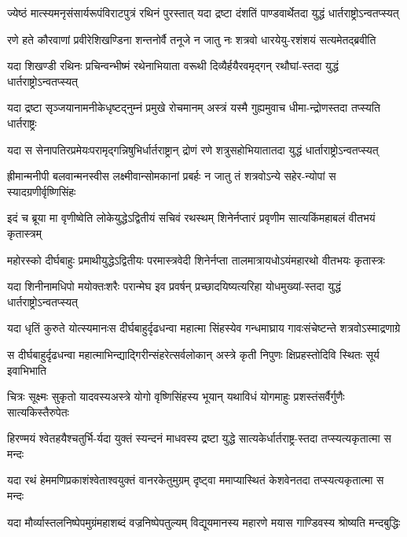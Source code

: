 \twolineshloka
{ज्येष्ठं मात्स्यमनृसंसार्यरूपंविराटपुत्रं रथिनं पुरस्तात्}
{यदा द्रष्टा दंशतिं पाण्डवार्थेतदा युद्धं धार्तराष्ट्रोऽन्वतप्स्यत्}


\twolineshloka
{रणे हते कौरवाणां प्रवीरेशिखण्डिना शन्तनोर्वै तनूजे}
{न जातु नः शत्रवो धारयेयु-रशंशयं सत्यमेतद्ब्रवीति}


\twolineshloka
{यदा शिखण्डी रथिनः प्रचिन्वन्भीष्मं रथेनाभियाता वरूथी}
{दिव्यैर्हयैरवमृद्गन् रथौघां-स्तदा युद्धं धार्तराष्ट्रोऽन्वतप्स्यत्}


\twolineshloka
{यदा द्रष्टा सृञ्जयानामनीकेधृष्टद्नुम्नं प्रमुखे रोचमानम्}
{अस्त्रं यस्मै गुह्यमुवाच धीमा-न्द्रोणस्तदा तप्स्यति धार्तराष्ट्रः}


\twolineshloka
{यदा स सेनापतिरप्रमेयःपरामृद्गन्निषुभिर्धार्तराष्ट्रान्}
{द्रोणं रणे शत्रुसहोभियातातदा युद्धं धार्ताराष्ट्रोऽन्वतप्स्यत्}


\twolineshloka
{ह्रीमान्मनीपी बलवान्मनस्वीस लक्ष्मीवान्सोमकानां प्रबर्हः}
{न जातु तं शत्रवोऽन्ये सहेर-न्योपां स स्यादग्रणीर्वृष्णिसिंहः}


\twolineshloka
{इदं च ब्रूया मा वृणीष्वेति लोकेयुद्धेऽद्वितीयं सचिवं रथस्थम्}
{शिनेर्नप्तारं प्रवृणीम सात्यकिंमहाबलं वीतभयं कृतास्त्रम्}


\twolineshloka
{महोरस्को दीर्घबाहुः प्रमाथीयुद्धेऽद्वितीयः परमास्त्रवेदी}
{शिनेर्नप्ता तालमात्रायधोऽयंमहारथो वीतभयः कृतास्त्रः}


\twolineshloka
{यदा शिनीनामधिपो मयोक्तःशरैः परान्मेघ इव प्रवर्षन्}
{प्रच्छादयिष्यत्यरिहा योधमुख्यां-स्तदा युद्धं धार्तराष्ट्रोऽन्वतप्स्यत्}


\twolineshloka
{यदा धृतिं कुरुते योत्स्यमानःस दीर्घबाहुर्दृढधन्वा महात्मा}
{सिंहस्येव गन्धमाघ्राय गावःसंचेष्टन्ते शत्रवोऽस्माद्रणाग्रे}


\twolineshloka
{स दीर्घबाहुर्दृढधन्वा महात्माभिन्द्याद्गिरीन्संहरेत्सर्वलोकान्}
{अस्त्रे कृती निपुणः क्षिप्रहस्तोदिवि स्थितः सूर्य इवाभिभाति}


\twolineshloka
{चित्रः सूक्ष्मः सुकृतो यादवस्यअस्त्रे योगो वृष्णिसिंहस्य भूयान्}
{यथाविधं योगमाहुः प्रशस्तंसर्वैर्गुणैः सात्यकिस्तैरुपेतः}


\twolineshloka
{हिरण्मयं श्वेतहयैश्चतुर्भि-र्यदा युक्तं स्यन्दनं माधवस्य}
{द्रष्टा युद्धे सात्यकेर्धार्तराष्ट्र-स्तदा तप्स्यत्यकृतात्मा स मन्दः}


\twolineshloka
{यदा रथं हेममणिप्रकाशंश्वेताश्वयुक्तं वानरकेतुमुग्रम्}
{दृष्ट्वा ममाप्यास्थितं केशवेनतदा तप्स्यत्यकृतात्मा स मन्दः}


\twolineshloka
{यदा मौर्व्यास्तलनिष्पेपमुग्रंमहाशब्दं वज्रनिष्पेपतुल्यम्}
{विद्यूयमानस्य महारणे मयास गाण्डिवस्य श्रोष्यति मन्दबुद्धिः}


